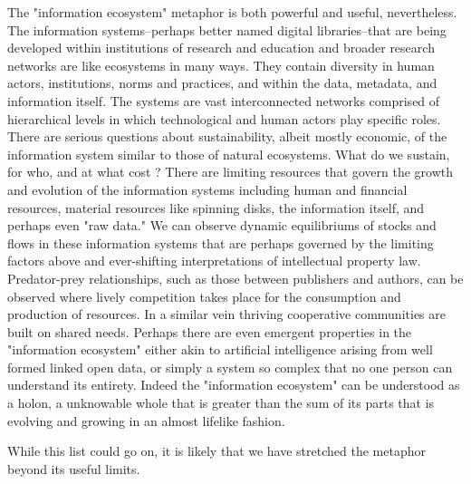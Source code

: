 The "information ecosystem" metaphor is both powerful and useful, nevertheless. The information systems--perhaps better named digital libraries--that are being developed within institutions of research and education and broader research networks are like ecosystems in many ways. They contain diversity in human actors, institutions, norms and practices, and within the data, metadata, and information itself. The systems are vast interconnected networks comprised of hierarchical levels in which technological and human actors play specific roles. There are serious questions about sustainability, albeit mostly economic, of the information system similar to those of natural ecosystems. What do we sustain, for who, and at what cost \cite[cf.][especially ch 3(?)]{liverman_2004, kitchin_2014}? There are limiting resources that govern the growth and evolution of the information systems including human and financial resources, material resources like spinning disks, the information itself, and perhaps even "raw data." We can observe dynamic equilibriums of stocks and flows in these information systems that are perhaps governed by the limiting factors above and ever-shifting interpretations of intellectual property law. Predator-prey relationships, such as those between publishers and authors, can be observed where lively competition takes place for the consumption and production of resources. In a similar vein thriving cooperative communities are built on shared needs. Perhaps there are even emergent properties in the "information ecosystem" either akin to artificial intelligence arising from well formed linked open data, or simply a system so complex that no one person can understand its entirety. Indeed the "information ecosystem" can be understood as a holon, a unknowable whole that is greater than the sum of its parts that is evolving and growing in an almost lifelike fashion. 

While this list could go on, it is likely that we have stretched the metaphor beyond its useful limits.

